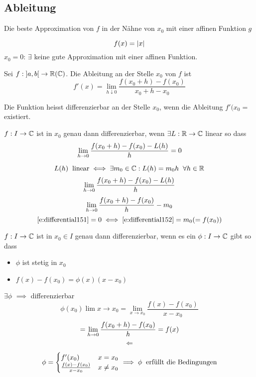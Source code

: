 \subsection{Ableitung}
\begin{Def}
  Die beste Approximation von $f$ in der Nähne von $x_0$ mit einer affinen Funktion $g$ 
\end{Def}
\begin{Bem}
  \[f(x)=\mathopen| x \mathclose|\]
  $x_0=0$: $\exists$ keine gute Approximation mit einer affinen Funktion.
\end{Bem}
\begin{Def}
  Sei $f:\left] a,b \right[\to\mathbb{R}(\mathbb{C})$. Die Ableitung an der Stelle $x_0$ von $f$ ist
  \[f'(x)=\lim_{h\downarrow 0}\frac{f(x_0+h)-f(x_0)}{x_0+h-x_0}\]
\end{Def}
\begin{Def}
  Die Funktion heisst differenzierbar an der Stelle $x_0$, wenn die Ableitung $f'(x_0=$ existiert.
\end{Def}
\begin{Sat}
  $f:I\to\mathbb{C}$ ist in $x_0$ genau dann differenzierbar, wenn $\exists L:\mathbb{R}\to\mathbb{C}$ linear so dass
  \[\displaystyle\lim_{h\rightarrow0}\frac{f(x_0+h)-f(x_0)-L(h)}{h}=0\]
\end{Sat}
\begin{Bew}
  \[L(h)\hspace{2mm}\text{linear}\iff\exists m_0\in\mathbb{C}: L(h)=m_0h\hspace{2mm}\forall h\in\mathbb{R}\]
  \begin{equation}
    \label{e:differential151}
    \displaystyle\lim_{h\rightarrow0}\frac{f(x_0+h)-f(x_0)-L(h)}{h}
  \end{equation}
  \begin{equation}
    \label{e:differential152}
    \displaystyle\lim_{h\rightarrow0}\frac{f(x_0+h)-f(x_0)}{h}-m_0
  \end{equation}
  \[\ref{e:differential151}=0\iff\ref{e:differential152}=m_0(=f(x_0))\]
\end{Bew}
\begin{Sat}
  $f:I\to\mathbb{C}$ ist in $x_0\in I$ genau dann differenzierbar, wenn es ein $\phi:I\to\mathbb{C}$ gibt so dass
  \begin{itemize}
    \item $\phi$ ist stetig in $x_0$
    \item $f(x)-f(x_0)=\phi(x)(x-x_0)$
  \end{itemize}
\end{Sat}
\begin{Bew}
  $\exists\phi$ $\implies$ differenzierbar
  \[\phi(x_0)\lim{x\to x_0}=\lim_{x\to x_0}\frac{f(x)-f(x_0)}{x-x_0}\]
  \[=\displaystyle\lim_{h\rightarrow0}\frac{f(x_0+h)-f(x_0)}{h}=f(x)\]
  \[\Leftarrow\]
  \begin{Def}
    \[\phi=\begin{cases}
      f'(x_0)& x=x_0\\
      \frac{f(x)-f(x_0)}{x-x_0}& x\neq x_0
    \end{cases}\implies \phi\hspace{2mm}\text{erfüllt die Bedingungen}\]
  \end{Def}
\end{Bew}
